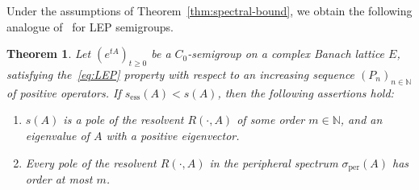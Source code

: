 \documentclass[sn-mathphys]{sn-jnl}%
\theoremstyle{thmstyleone}
\newtheorem{theorem}{Theorem}[section]
\theoremstyle{thmstylethree}
\newcommand{\NN}{\mathbb{N}}
\begin{document}
Under the assumptions of Theorem~\ref{thm:spectral-bound}, we obtain the following analogue of~\cite[Theorem 7.7]{DGK1} for LEP semigroups.
\begin{theorem}
	Let $(e^{tA})_{t\ge 0}$ be a $C_0$-semigroup on a complex Banach lattice $E$, satisfying the~\eqref{eq:LEP} property with respect to an increasing sequence $(P_n)_{n\in\NN}$ of positive operators. If $s_{\mathrm{ess}}(A)<s(A)$, then the following assertions hold:
	\begin{enumerate}[\upshape (i)]
		\item $s(A)$ is a pole of the resolvent $R(\cdot, A)$ of some order $m\in\NN$, and an eigenvalue of $A$ with a positive eigenvector.
		\item Every pole of the resolvent $R(\cdot, A)$ in the peripheral spectrum $\sigma_{\mathrm{per}}(A)$ has order at most $m$.
	\end{enumerate}
\end{theorem}
\end{document}
